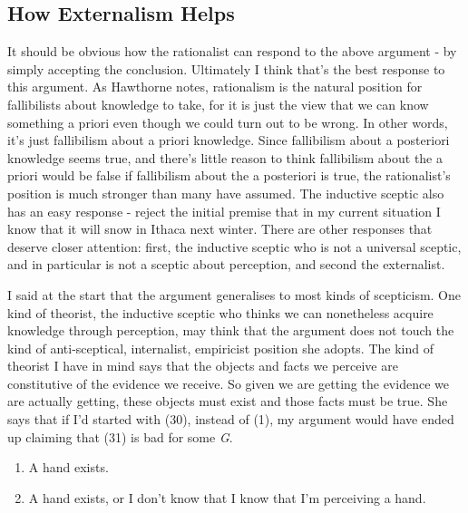 \documentclass[
  11pt,
  letterpaper,
  DIV=11,
  numbers=noendperiod,
  oneside]{scrartcl}
\begin{document}
\subsection{How Externalism Helps}\label{how-externalism-helps}

It should be obvious how the rationalist can respond to the above
argument - by simply accepting the conclusion. Ultimately I think that's
the best response to this argument. As Hawthorne notes, rationalism is
the natural position for fallibilists about knowledge to take, for it is
just the view that we can know something a priori even though we could
turn out to be wrong. In other words, it's just fallibilism about a
priori knowledge. Since fallibilism about a posteriori knowledge seems
true, and there's little reason to think fallibilism about the a priori
would be false if fallibilism about the a posteriori is true, the
rationalist's position is much stronger than many have
assumed. The
inductive sceptic also has an easy response - reject the initial premise
that in my current situation I know that it will snow in Ithaca next
winter. There are other responses that deserve closer attention: first,
the inductive sceptic who is not a universal sceptic, and in particular
is not a sceptic about perception, and second the externalist.

I said at the start that the argument generalises to most kinds of
scepticism. One kind of theorist, the inductive sceptic who thinks we
can nonetheless acquire knowledge through perception, may think that the
argument does not touch the kind of anti-sceptical, internalist,
empiricist position she adopts. The kind of theorist I have in mind says
that the objects and facts we perceive are constitutive of the evidence
we receive. So given we are getting the evidence we are actually
getting, these objects must exist and those facts must be true. She says
that if I'd started with (30), instead of (1), my argument would have
ended up claiming that (31) is bad for some \emph{G}.

\begin{enumerate}
\def\labelenumi{\arabic{enumi}.}
\setcounter{enumi}{29}
\item
  A hand exists.
\item
  A hand exists, or I don't know that I know that I'm perceiving a hand.
\end{enumerate}
\end{document}
